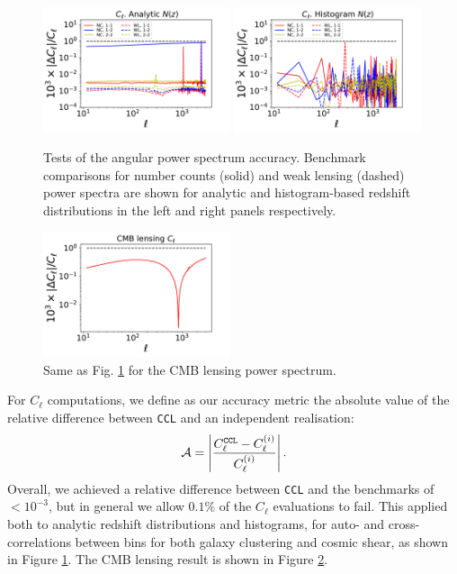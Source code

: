 \documentclass[\docopts]{\docclass}
\newcommand{\ccl}{{\tt CCL}\xspace}
\begin{document}
\begin{figure}
\includegraphics[width=0.49\textwidth]{Cl_analytic}
\includegraphics[width=0.49\textwidth]{Cl_histo}
\caption{Tests of the angular power spectrum accuracy. Benchmark comparisons for number counts (solid) and weak lensing (dashed) power spectra are shown for analytic and histogram-based redshift distributions in the left and right panels respectively.}
\label{fig:cls_limber}
\end{figure}
\begin{figure}
\includegraphics[width=0.49\textwidth]{Cl_cmblens}
\caption{Same as Fig. \ref{fig:cls_limber} for the CMB lensing power spectrum.}
\label{fig:cls_cmblens}
\end{figure}

For $C_\ell$ computations, we define as our accuracy metric the absolute value of the relative difference between \ccl and an independent realisation:
\begin{equation}
  \mathcal{A}=\left|\frac{C_\ell^{\tt CCL}-C_\ell^{(i)}}{C_\ell^{(i)}}\right|.
\end{equation}
Overall, we achieved a relative difference between \ccl and the benchmarks of $<10^{-3}$, but in general we allow $0.1\%$ of the $C_\ell$ evaluations to fail. This applied both to analytic redshift distributions and histograms, for auto- and cross-correlations between bins for both galaxy clustering and cosmic shear, as shown in Figure \ref{fig:cls_limber}. The CMB lensing result is shown in Figure \ref{fig:cls_cmblens}.
\end{document}
